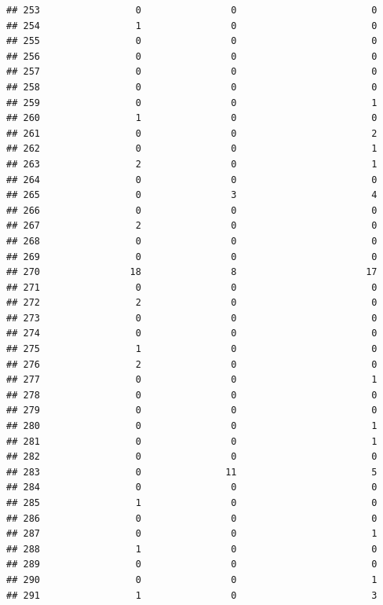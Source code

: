 \documentclass[
]{article}
\begin{document}
\begin{verbatim}
## 253                 0                0                        0
## 254                 1                0                        0
## 255                 0                0                        0
## 256                 0                0                        0
## 257                 0                0                        0
## 258                 0                0                        0
## 259                 0                0                        1
## 260                 1                0                        0
## 261                 0                0                        2
## 262                 0                0                        1
## 263                 2                0                        1
## 264                 0                0                        0
## 265                 0                3                        4
## 266                 0                0                        0
## 267                 2                0                        0
## 268                 0                0                        0
## 269                 0                0                        0
## 270                18                8                       17
## 271                 0                0                        0
## 272                 2                0                        0
## 273                 0                0                        0
## 274                 0                0                        0
## 275                 1                0                        0
## 276                 2                0                        0
## 277                 0                0                        1
## 278                 0                0                        0
## 279                 0                0                        0
## 280                 0                0                        1
## 281                 0                0                        1
## 282                 0                0                        0
## 283                 0               11                        5
## 284                 0                0                        0
## 285                 1                0                        0
## 286                 0                0                        0
## 287                 0                0                        1
## 288                 1                0                        0
## 289                 0                0                        0
## 290                 0                0                        1
## 291                 1                0                        3

\end{verbatim}
\end{document}
